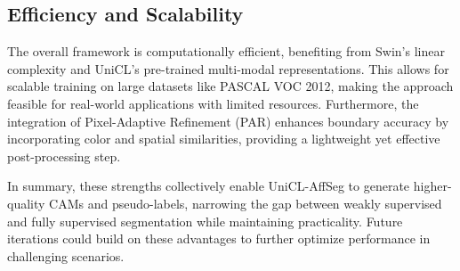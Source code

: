 \subsection{Efficiency and Scalability}
The overall framework is computationally efficient, benefiting from Swin's linear complexity and UniCL's pre-trained multi-modal representations. This allows for scalable training on large datasets like PASCAL VOC 2012, making the approach feasible for real-world applications with limited resources. Furthermore, the integration of Pixel-Adaptive Refinement (PAR) enhances boundary accuracy by incorporating color and spatial similarities, providing a lightweight yet effective post-processing step.

In summary, these strengths collectively enable UniCL-AffSeg to generate higher-quality CAMs and pseudo-labels, narrowing the gap between weakly supervised and fully supervised segmentation while maintaining practicality. Future iterations could build on these advantages to further optimize performance in challenging scenarios.
